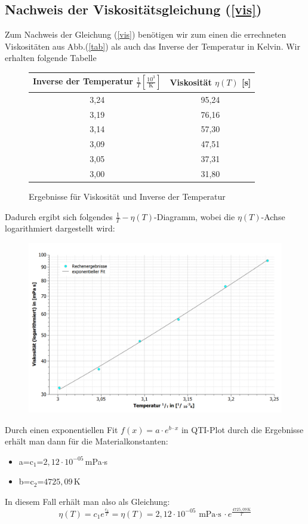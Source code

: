\documentclass[fontsize=12pt]{scrartcl}
\begin{document}
\subsection{Nachweis der Viskositätsgleichung (\ref{vis})}

Zum Nachweis der Gleichung (\ref{vis}) benötigen wir zum einen die errechneten Viskositäten aus Abb.(\ref{tab}) als auch das Inverse der Temperatur in Kelvin. Wir erhalten folgende Tabelle
 \begin{figure}[H]
 \vspace{-12pt}
\centering
\caption{Ergebnisse für Viskosität und Inverse der Temperatur}
\begin{tabular}{|c|c|} \hline
\rule{0pt}{12pt} Inverse der Temperatur $ \frac{1}{T} [\frac{10^3}{\text{K}}] $&Viskosität $\eta(T)$ [s] \\ \hline
3,24	&95,24 \\ \hline
3,19	&76,16 \\ \hline
3,14	&57,30 \\ \hline
3,09	&47,51 \\ \hline
3,05	&37,31 \\ \hline
3,00	&31,80 \\ \hline
\end{tabular}				
\end{figure}
Dadurch ergibt sich folgendes $\frac{1}{T}-\eta(T)$-Diagramm, wobei die $\eta(T)$-Achse logarithmiert dargestellt wird:
\begin{figure}[H]
\includegraphics[width=1\textwidth]{Graphik/Eta}
\end{figure}

\newpage

Durch einen exponentiellen Fit $f(x)=a\cdot e^{b\cdot x}$ in QTI-Plot durch die Ergebnisse erhält man dann für die Materialkonstanten:
\begin{itemize}
\item[] a=c$_1$=$2,12\cdot 10^{-05}$\,mPa$\cdot$s
\item[] b=c$_2$=$4725,09$\,K
\end{itemize}
In diesem Fall erhält man also als Gleichung:
\begin{equation*}
\eta(T)=c_1 e^{\frac{c_2}{T}}=\eta(T)=2,12\cdot 10^{-05}\,\text{mPa$\cdot$s} \cdot e^{\frac{4725,09\,\text{K}}{T}}
\end{equation*}
\newpage
\end{document}

